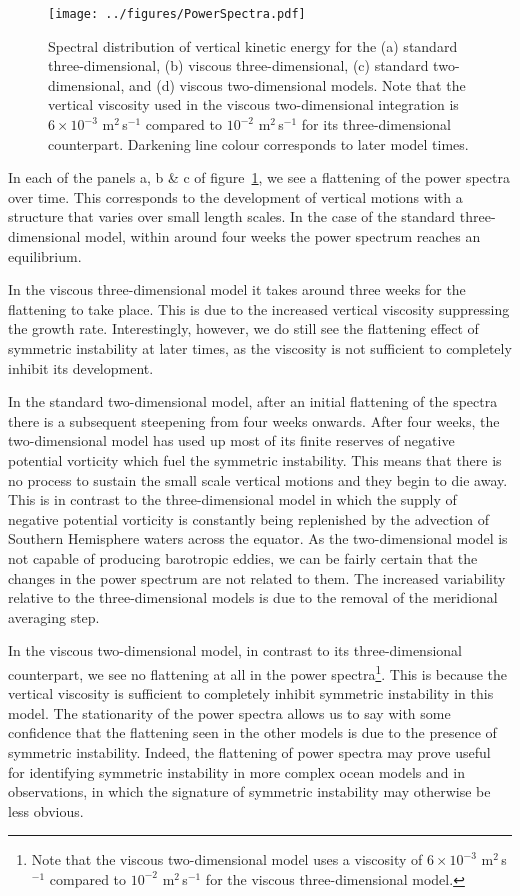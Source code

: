 \begin{figure} 
    \centering
    \texttt{[image: ../figures/PowerSpectra.pdf]}
    \caption{Spectral distribution of vertical kinetic energy for the (a) standard three-dimensional, (b) viscous three-dimensional, (c) standard two-dimensional, and (d) viscous two-dimensional models. Note that the vertical viscosity used in the viscous two-dimensional integration is $6 \times 10^{-3}$ m$^2\,$s$^{-1}$ compared to $10^{-2}$ m$^2\,$s$^{-1}$ for its three-dimensional counterpart. Darkening line colour corresponds to later model times.}
    \label{fig:SpectralEnergyDensity}
\end{figure}

In each of the panels a, b \& c of figure~\ref{fig:SpectralEnergyDensity}, we see a flattening of the power spectra over time. This corresponds to the development of vertical motions with a structure that varies over small length scales. In the case of the standard three-dimensional model, within around four weeks the power spectrum reaches an equilibrium.

In the viscous three-dimensional model it takes around three weeks for the flattening to take place. This is due to the increased vertical viscosity suppressing the growth rate. Interestingly, however, we do still see the flattening effect of symmetric instability at later times, as the viscosity is not sufficient to completely inhibit its development.

In the standard two-dimensional model, after an initial flattening of the spectra there is a subsequent steepening from four weeks onwards. After four weeks, the two-dimensional model has used up most of its finite reserves of negative potential vorticity which fuel the symmetric instability. This means that there is no process to sustain the small scale vertical motions and they begin to die away. This is in contrast to the three-dimensional model in which the supply of negative potential vorticity is constantly being replenished by the advection of Southern Hemisphere waters across the equator. As the two-dimensional model is not capable of producing barotropic eddies, we can be fairly certain that the changes in the power spectrum are not related to them. The increased variability relative to the three-dimensional models is due to the removal of the meridional averaging step.

In the viscous two-dimensional model, in contrast to its three-dimensional counterpart, we see no flattening at all in the power spectra\footnote{Note that the viscous two-dimensional model uses a viscosity of $6 \times 10^{-3}$ m$^2$\,s$^{-1}$ compared to $10^{-2}$ m$^2$\,s$^{-1}$ for the viscous three-dimensional model.}. This is because the vertical viscosity is sufficient to completely inhibit symmetric instability in this model. The stationarity of the power spectra allows us to say with some confidence that the flattening seen in the other models is due to the presence of symmetric instability. Indeed, the flattening of power spectra may prove useful for identifying symmetric instability in more complex ocean models and in observations, in which the signature of symmetric instability may otherwise be less obvious.

